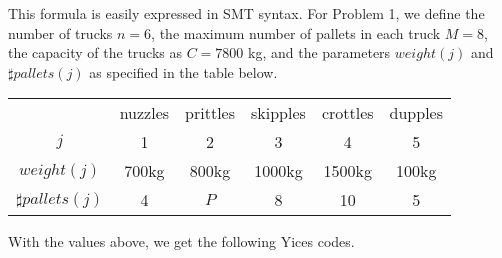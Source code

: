\documentclass[11pt]{article}
\begin{document}
This formula is easily expressed in SMT syntax. For Problem 1, we define the number of trucks $n = 6$, the maximum number of pallets in each truck $M = 8$, the capacity of the trucks as $C = 7800$ kg, and the parameters $weight(j)$ and $\sharp pallets(j)$ as specified in the table below.
\begin{center}
\begin{tabular}{|c|c|c|c|c|c|}
  \hline
    & nuzzles & prittles & skipples & crottles & dupples \\
  $j$ & 1 & 2 & 3 & 4 & 5 \\
  $weight(j)$ & 700kg & 800kg & 1000kg & 1500kg & 100kg \\
  $\sharp pallets(j)$ & 4 & $P$ & 8 & 10 & 5 \\
  \hline
\end{tabular}
\end{center}

With the values above, we get the following Yices codes.
\end{document}
